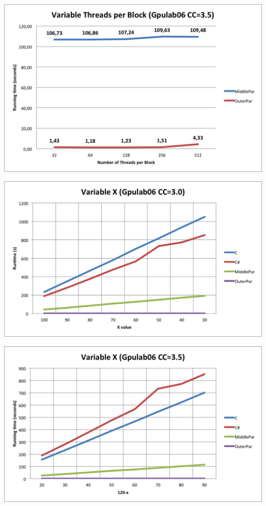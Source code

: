 \centerline{\includegraphics[width=\textwidth]{img/Gpulab-tpb35.png}}

\centerline{\includegraphics[width=\textwidth]{img/Gpulab-varx30.png}}

\centerline{\includegraphics[width=\textwidth]{img/Gpulab-varx35.png}}

